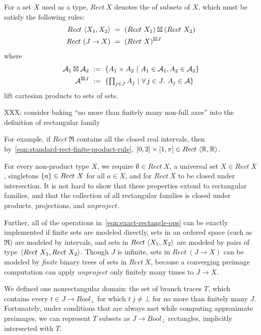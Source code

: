 \documentclass[preprint]{sigplanconf}
\begin{document}
\begin{definition}
For a set $X$ used as a type, $Rect~X$ denotes the  of subsets of $X$, which must be satisfy the following rules:
\begin{align}
	Rect~\langle{X_1,X_2}\rangle &\ = \ (Rect~X_1) \boxtimes (Rect~X_2)
	\label{eqn:standard-rect-finite-product-rule}
\\
	Rect~(J \to X) &\ = \ (Rect~X)^{\boxtimes J}
	\label{eqn:standard-rect-arbitrary-product-rule}
\end{align}
where
\begin{align}
	\mathcal{A}_1 \boxtimes \mathcal{A}_2 &\ := \ \lbrace {A_1 \times A_2} \ \lvert\ {A_1 \in \mathcal{A}_1, A_2 \in \mathcal{A}_2} \rbrace \\
	\mathcal{A}^{\boxtimes J} &\ := \ \lbrace {\textstyle\prod_{j \in J} A_j} \ \lvert\ {\forall\,{j \in J}\ldotp\,{A_j \in \mathcal{A}}} \rbrace
\end{align}
lift cartesian products to sets of sets.
\label{def:standard-rectangle}
\end{definition}

XXX: consider baking ``no more than finitely many non-full axes'' into the definition of rectangular family

For example, if $Rect~\Re$ contains all the closed real intervals, then by~\eqref{eqn:standard-rect-finite-product-rule}, $[0,2] \times [1,\pi] \in Rect~\langle{\mathbb{R},\mathbb{R}}\rangle$.

For every non-product type $X$, we require $\emptyset \in Rect~X$, a universal set $X \in Rect~X$, singletons $\{{a}\} \in Rect~X$ for all $a \in X$, and for $Rect~X$ to be closed under intersection.
It is not hard to show that these properties extend to rectangular families, and that the collection of all rectangular families is closed under products, projections, and $unproject$.

Further, all of the operations in~\eqref{eqn:exact-rectangle-ops} can be exactly implemented if finite sets are modeled directly, sets in an ordered space (such as $\Re$) are modeled by intervals, and sets in $Rect~\langle{X_1,X_2}\rangle$ are modeled by pairs of type $\langle{Rect~X_1,Rect~X_2}\rangle$.
Though $J$ is infinite, sets in $Rect~(J \to X)$ can be modeled by \emph{finite} binary trees of sets in $Rect~X$, because a converging preimage computation can apply $unproject$ only finitely many times to $J \to X$.

We defined one nonrectangular domain: the set of branch traces $T$, which contains every $t \in J \to Bool_\bot$ for which $t~j \neq \bot$ for no more than finitely many $J$.
Fortunately, under conditions that are always met while computing approximate preimages, we can represent $T$ subsets as $J \to Bool_\bot$ rectangles, implicitly intersected with $T$.
\end{document}
